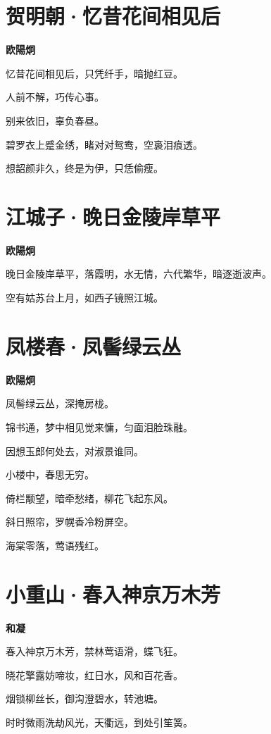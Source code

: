 \documentclass[12pt,a4paper]{ctexbook}
\begin{document}
\section{贺明朝·忆昔花间相见后}
\textbf{欧陽炯}\par\vspace{0.5em}
忆昔花间相见后，只凭纤手，暗抛红豆。\par
人前不解，巧传心事。\par
别来依旧，辜负春昼。\par
碧罗衣上蹙金绣，睹对对鸳鸯，空裛泪痕透。\par
想韶颜非久，终是为伊，只恁偷瘦。\par

\section{江城子·晚日金陵岸草平}
\textbf{欧陽炯}\par\vspace{0.5em}
晚日金陵岸草平，落霞明，水无情，六代繁华，暗逐逝波声。\par
空有姑苏台上月，如西子镜照江城。\par

\section{凤楼春·凤髻绿云丛}
\textbf{欧陽炯}\par\vspace{0.5em}
凤髻绿云丛，深掩房栊。\par
锦书通，梦中相见觉来慵，匀面泪脸珠融。\par
因想玉郎何处去，对淑景谁同。\par
小楼中，春思无穷。\par
倚栏颙望，暗牵愁绪，柳花飞起东风。\par
斜日照帘，罗幌香冷粉屏空。\par
海棠零落，莺语残红。\par

\section{小重山·春入神京万木芳}
\textbf{和凝}\par\vspace{0.5em}
春入神京万木芳，禁林莺语滑，蝶飞狂。\par
晓花擎露妨啼妆，红日水，风和百花香。\par
烟锁柳丝长，御沟澄碧水，转池塘。\par
时时微雨洗劫风光，天衢远，到处引笙簧。\par
\end{document}
